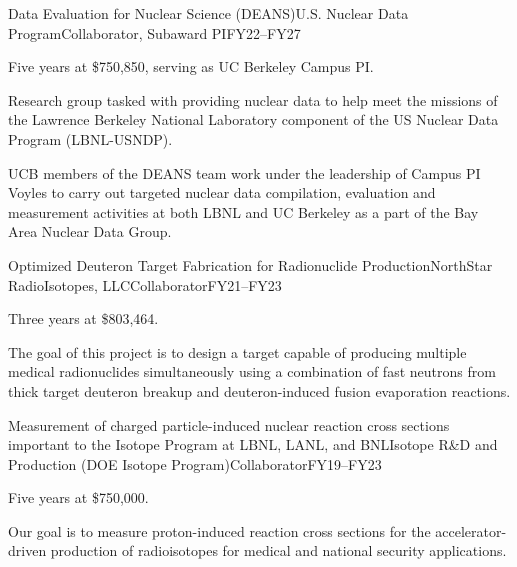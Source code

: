 \begin{rSubsection}{Data Evaluation for Nuclear Science (DEANS)}{\textnormal{U.S. Nuclear Data Program}}{Collaborator, Subaward PI}{FY22--FY27}
\item    Five years at \$750,850, serving as UC Berkeley Campus PI.
\item Research group tasked with providing nuclear data to help meet the missions of the Lawrence Berkeley National Laboratory component of the US Nuclear Data Program (LBNL-USNDP). 
\item UCB members of the DEANS team work under the leadership of Campus PI Voyles to carry out targeted nuclear
data compilation, evaluation and measurement activities at both LBNL and UC Berkeley as a part of the Bay Area Nuclear Data Group. 


\end{rSubsection}



\begin{rSubsection}{Optimized Deuteron Target Fabrication for Radionuclide Production}{\textnormal{NorthStar RadioIsotopes, LLC}}{Collaborator}{FY21--FY23}
\item    Three years at \$803,464.
\item The goal of this project is to design a target capable of producing multiple medical radionuclides simultaneously using a combination of fast neutrons from thick target deuteron breakup and deuteron-induced fusion evaporation reactions.

\end{rSubsection}

\begin{rSubsection}{Measurement of charged particle-induced nuclear
reaction cross sections important to the Isotope Program at LBNL, LANL, and BNL}{\textnormal{Isotope R\&D and Production (DOE Isotope Program)}}{Collaborator}{FY19--FY23}
\item    Five years at \$750,000.
\item Our goal is to measure proton-induced reaction cross sections for the accelerator-driven production of radioisotopes for medical and national security applications.

\end{rSubsection}


